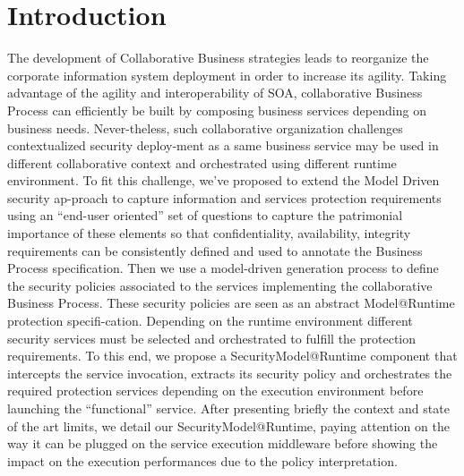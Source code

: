 \documentclass[runningheads,a4paper]{llncs}
\begin{document}
\section{Introduction}
The development of Collaborative Business strategies leads to reorganize the corporate information system deployment in order to increase its agility. Taking advantage of the agility and interoperability of SOA, collaborative Business Process can efficiently be built by composing business services depending on business needs. Never-theless, such collaborative organization challenges contextualized security deploy-ment as a same business service may be used in different collaborative context and orchestrated using different runtime environment.
To fit this challenge, we've proposed to extend the Model Driven security ap-proach to capture information and services protection requirements using an “end-user oriented” set of questions to capture the patrimonial importance of these elements so that confidentiality, availability, integrity requirements can be consistently defined and used to annotate the Business Process specification. Then we use a model-driven generation process to define the security policies associated to the services implementing the collaborative Business Process.
These security policies are seen as an abstract Model@Runtime protection specifi-cation. Depending on the runtime environment different security services must be selected and orchestrated to fulfill the protection requirements. To this end, we propose a SecurityModel@Runtime component that intercepts the service invocation, extracts its security policy and orchestrates the required protection services depending on the execution environment before launching the “functional” service. 
After presenting briefly the context and state of the art limits, we detail our SecurityModel@Runtime, paying attention on the way it can be plugged on the service execution middleware before showing the impact on the execution performances due to the policy interpretation.
\end{document}
